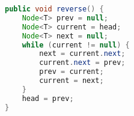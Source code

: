 \vspace{0.5cm}


\begin{lstlisting}[language=Java]
public void reverse() {
	Node<T> prev = null;
	Node<T> current = head;
	Node<T> next = null;
	while (current != null) {
		next = current.next;
		current.next = prev;
		prev = current;
		current = next;
	}
	head = prev;
}
\end{lstlisting}

\newpage